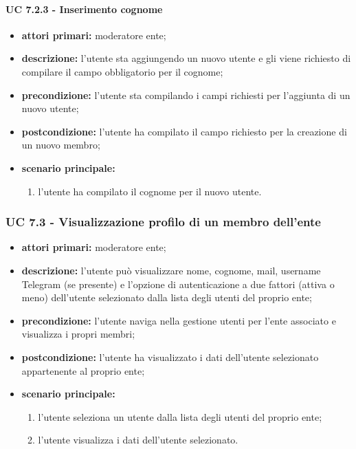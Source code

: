 			\paragraph{UC 7.2.3 - Inserimento cognome}
			\begin{itemize}
				\item \textbf{attori primari:} moderatore ente;
				\item \textbf{descrizione:} l'utente sta aggiungendo un nuovo utente e gli viene richiesto di compilare il campo obbligatorio per il cognome;
				\item \textbf{precondizione:} l'utente sta compilando i campi richiesti per l'aggiunta di un nuovo utente;
				\item \textbf{postcondizione:} l'utente ha compilato il campo richiesto per la creazione di un nuovo membro;
				\item \textbf{scenario principale:}
				\begin{enumerate}
					\item{l'utente ha compilato il cognome per il nuovo utente.}
				\end{enumerate}
			\end{itemize}

			\subsubsection{UC 7.3 - Visualizzazione profilo di un membro dell'ente}
			\begin{itemize}
				\item \textbf{attori primari:} moderatore ente;
				\item \textbf{descrizione:} l'utente può visualizzare nome, cognome, mail, username Telegram (se presente) e l'opzione di autenticazione a due fattori (attiva o meno) dell'utente selezionato dalla lista degli utenti del proprio ente;
				\item \textbf{precondizione:} l'utente naviga nella gestione utenti per l'ente associato e visualizza i propri membri;
				\item \textbf{postcondizione:} l'utente ha visualizzato i dati dell'utente selezionato appartenente al proprio ente;
				\item \textbf{scenario principale:}
				\begin{enumerate}
					\item{l'utente seleziona un utente dalla lista degli utenti del proprio ente;}
					\item{l'utente visualizza i dati dell'utente selezionato.}
				\end{enumerate}
			\end{itemize}


